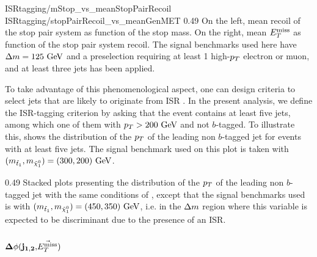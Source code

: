 
                     {ISRtagging/mStop_vs_meanStopPairRecoil}
                     {ISRtagging/stopPairRecoil_vs_meanGenMET}
                     {0.49}
                     {On the left, mean recoil of the stop pair system as function
                     of the stop mass.
                     On the right, mean $E_T^\text{miss}$ as function of the stop pair system recoil.
                     The signal benchmarks used here have $\Delta m = 125~\text{GeV}$ and a
                     preselection requiring at least 1 high-$p_T$ electron or muon,
                     and at least three jets has been applied.}

    To take advantage of this phenomenological aspect, one can design criteria to
    select jets that are likely to originate from ISR \cite{ISRGluinoTevatron, ISRtagging}.
    In the present analysis, we define the ISR-tagging criterion by asking that
    the event contains at least five jets, among which one of them with $p_T > 200 ~\text{GeV}$
    and not $b$-tagged. To illustrate this, 
    shows the distribution of the $p_T$ of the leading non $b$-tagged jet for
    events with at least five jets. The signal benchmark used on this plot is
    taken with $(m_{\tilde{t}_1},m_{\tilde{\chi}_1^0}) = (300,200)~\text{GeV}$.

                 {0.49}
                 {Stacked plots presenting the distribution of the $p_T$ of the leading
                 non $b$-tagged jet
                 with the same conditions of ,
                 except that the signal benchmarks used is with $(m_{\tilde{t}_1},
                 m_{\tilde{\chi}_1^0}) = (450,350)~\text{GeV}$, i.e. in the $\Delta m$ region where
                 this variable is expected to be discriminant due to
                 the presence of an ISR.}

                 \subsubsection{$\mathbf{\Delta \phi( j_{1,2},} \vec{E_T^\text{miss}} \mathbf{)}$ }

